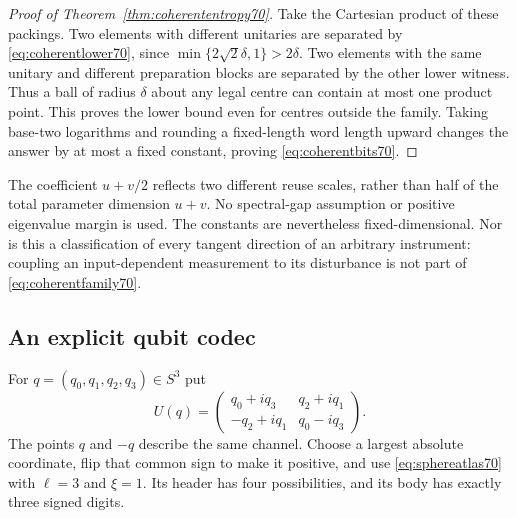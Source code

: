 \begin{proof}[Proof of Theorem~\ref{thm:coherententropy70}]
Take the Cartesian product of these packings. Two elements with different
unitaries are separated by \eqref{eq:coherentlower70}, since
$\min\{2\sqrt2\delta,1\}>2\delta$. Two elements with the same unitary
and different preparation blocks are separated by the other lower witness.
Thus a ball of radius $\delta$ about any legal centre can contain at most
one product point. This proves the lower bound even for centres outside
the family. Taking base-two logarithms and rounding a fixed-length word
length upward changes the answer by at most a fixed constant, proving
\eqref{eq:coherentbits70}.
\end{proof}

The coefficient $u+v/2$ reflects two different reuse scales, rather than
half of the total parameter dimension $u+v$. No spectral-gap assumption
or positive eigenvalue margin is used. The constants are nevertheless
fixed-dimensional. Nor is this a classification of every tangent direction
of an arbitrary instrument: coupling an input-dependent measurement to
its disturbance is not part of \eqref{eq:coherentfamily70}.

\subsection{An explicit qubit codec}
For $q=(q_0,q_1,q_2,q_3)\in S^3$ put
\begin{equation}\label{eq:quaternion70}
 U(q)=\begin{pmatrix}q_0+iq_3&q_2+iq_1\\-q_2+iq_1&q_0-iq_3\end{pmatrix}.
\end{equation}
The points $q$ and $-q$ describe the same channel. Choose a largest
absolute coordinate, flip that common sign to make it positive, and use
\eqref{eq:sphereatlas70} with $\ell=3$ and $\xi=1$. Its header has
four possibilities, and its body has exactly three signed digits.

